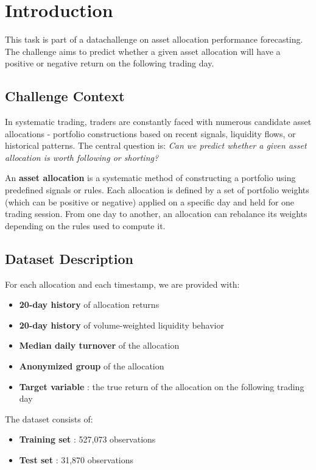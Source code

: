 \section{Introduction}

This task is part of a datachallenge on asset allocation performance forecasting. The challenge aims to predict whether a given asset allocation will have a positive or negative return on the following trading day.

\subsection{Challenge Context}

In systematic trading, traders are constantly faced with numerous candidate asset allocations - portfolio constructions based on recent signals, liquidity flows, or historical patterns. The central question is: \textit{Can we predict whether a given asset allocation is worth following or shorting?}

An \textbf{asset allocation} is a systematic method of constructing a portfolio using predefined signals or rules. Each allocation is defined by a set of portfolio weights (which can be positive or negative) applied on a specific day and held for one trading session. From one day to another, an allocation can rebalance its weights depending on the rules used to compute it.

\subsection{Dataset Description}

For each allocation and each timestamp, we are provided with:
\begin{itemize}
      \item \textbf{20-day history} of allocation returns
      \item \textbf{20-day history} of volume-weighted liquidity behavior
      \item \textbf{Median daily turnover} of the allocation
      \item \textbf{Anonymized group} of the allocation
      \item \textbf{Target variable} : the true return of the allocation on the following trading day
\end{itemize}

The dataset consists of:
\begin{itemize}
      \item \textbf{Training set} : 527,073 observations
      \item \textbf{Test set} : 31,870 observations
\end{itemize}

